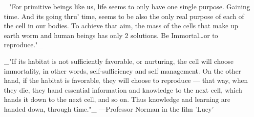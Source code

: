 _"For primitive beings like us, life seems to only have one single purpose. Gaining time. And its going thru’ time, seems to be also the only real purpose of each of the cell in our bodies. To achieve that aim, the mass of the cells that make up earth worm and human beings has only 2 solutions. Be Immortal…or to reproduce."_

_"If its habitat is not sufficiently favorable, or nurturing, the cell will choose immortality, in other words, self-sufficiency and self management. On the other hand, if the habitat is favorable, they will choose to reproduce — that way, when they die, they hand essential information and knowledge to the next cell, which hands it down to the next cell, and so on. Thus knowledge and learning are handed down, through time."_
---Professor Norman in the film 'Lucy'